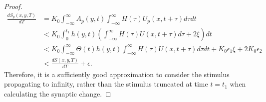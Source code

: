 \begin{proof}
	\begin{align}
		\frac{dS_p(x,y,T)}{dT} & = K_0  \int_{-\infty}^{\infty }A_p(y,t) \int_{-\infty}^{\infty}   H(\tau)U_p(x,t+\tau)   d\tau dt\\
		&<  K_0  \int_{0}^{t_1}h(y,t) \left (\int_{-\infty}^{\infty}   H(\tau)U(x,t+\tau) d\tau  + 2\xi \right)  dt\\
		&<  K_0  \int_{-\infty}^{\infty}\Theta(t) h(y,t) \int_{-\infty}^{\infty}   H(\tau)U(x,t+\tau) d\tau dt +K_0 \epsilon_1 \xi+2K_0 \epsilon_2\\
		&<  \frac{dS(x,y,T)}{dT} + \epsilon.
	\end{align}
	Therefore, it is a sufficiently good approximation to consider the stimulus propagating to infinity, rather than the stimulus truncated at time $t=t_1$ when calculating the synaptic change.
\end{proof}